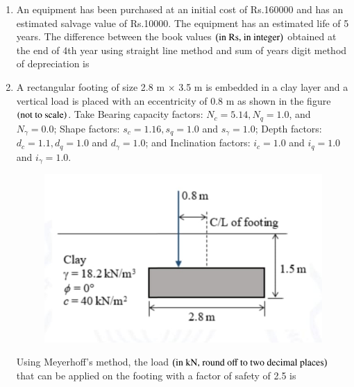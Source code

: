 \documentclass[journal,12pt,onecolumn]{article}
\theoremstyle{remark}
\begin{document}
\begin{enumerate}
\hfill{}

\item An equipment has been purchased at an initial cost of Rs.160000 and has an estimated salvage value of Rs.10000. The equipment has an estimated life of 5 years. The difference between the book values $\left(\text{in Rs, in integer}\right)$ obtained at the end of 4th year using straight line method and sum of years digit method of depreciation is \underline{\hspace{2cm}}

\hfill{}

\item A rectangular footing of size 2.8 m $\times$ 3.5 m is embedded in a clay layer and a vertical load is placed with an eccentricity of 0.8 m as shown in the figure  $\left(\text{not to scale}\right)$. Take Bearing capacity factors: $N_c = 5.14, N_q = 1.0$, and $N_{\gamma} = 0.0$; Shape factors: $s_c = 1.16, s_q = 1.0$ and $s_{\gamma}= 1.0$; Depth factors: $d_c = 1.1, d_q = 1.0$ and $d_{\gamma} = 1.0$; and Inclination factors: $i_c = 1.0$ and $i_q = 1.0$ and $i_{\gamma}= 1.0$.
\begin{figure}[H]
    \centering
    \includegraphics[width=0.7\columnwidth]{figs/2q44.jpg}
    \caption{}
    \label{fig:q44}
\end{figure}
Using Meyerhoff's method, the load $\left(\text{in kN, round off to two decimal places}\right)$ that can be applied on the footing with a factor of safety of 2.5 is \underline{\hspace{2cm}}

\hfill{}


\end{enumerate}
\end{document}
